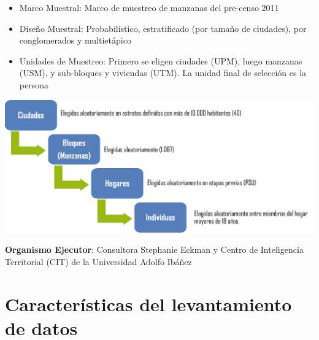 \documentclass[
  12pt,
  openany]{book}
\begin{document}
\begin{itemize}
\item
  Marco Muestral: Marco de muestreo de manzanas del pre-censo 2011
\item
  Diseño Muestral: Probabilístico, estratificado (por tamaño de ciudades), por conglomerados y multietápico
\item
  Unidades de Muestreo: Primero se eligen ciudades (UPM), luego manzanas (USM), y sub-bloques y viviendas (UTM). La unidad final de selección es la persona
\end{itemize}

\includegraphics[width=25.24in]{1_input/imagenes/etapas_seleccion}

\textbf{Organismo Ejecutor}: Consultora Stephanie Eckman y Centro de Inteligencia Territorial (CIT) de la Universidad Adolfo Ibáñez

\hypertarget{caracteruxedsticas-del-levantamiento-de-datos}{%
\section{Características del levantamiento de datos}\label{caracteruxedsticas-del-levantamiento-de-datos}}
\end{document}
